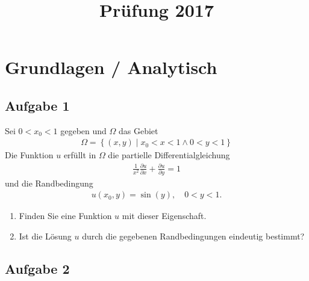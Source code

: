 \documentclass[
	final,
	a4paper,
	oneside,
	parskip=full,
	headings=standardclasses,
	headings=big,
	pointednumbers
]{scrartcl}
\title{Prüfung 2017}
\author{}
\date{}
\begin{document}
    \maketitle
    \vspace{-25mm}
    \section*{Grundlagen / Analytisch}
	\subsection*{Aufgabe 1}

    Sei $0 < x_0 < 1 $ gegeben und $\Omega$ das Gebiet
    \begin{align}
        \Omega = \left\{\left(x, y\right) \mid x_0 < x < 1 \land 0 < y < 1 \right\}
    \end{align}
    Die Funktion $u$ erfüllt in $\Omega$ die partielle Differentialgleichung
    \begin{align}
        \frac{1}{x^2}\frac{\partial u}{\partial x} + \frac{\partial u}{\partial y} = 1
    \end{align}
    und die Randbedingung
    \begin{align*}
        u{\left(x_0, y \right)} = \sin{\left(y\right)}, \quad 0 < y < 1.
    \end{align*}
    \begin{enumerate}
        \item Finden Sie eine Funktion $u$ mit dieser Eigenschaft.
        \item Ist die Lösung $u$ durch die gegebenen Randbedingungen eindeutig bestimmt?
    \end{enumerate}

	\subsection*{Aufgabe 2}
\end{document}
